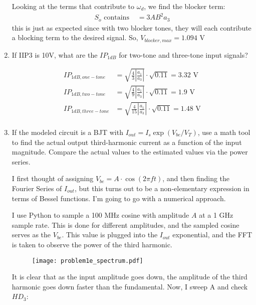 \begin{enumerate}[label=(\alph*)]
    Looking at the terms that contribute to $\omega_d$, we find the blocker term:
    \begin{align*}
        S_o \text{ contains } &= 3 A B^2 a_3
    \end{align*}
    this is just as expected since with two blocker tones, they will each contribute a blocking term to the desired signal.
    So, $V_{blocker,max} = 1.094 \text{ V}$

    \item {\color{blue} If IIP3 is 10V, what are the $IP_{1dB}$ for two-tone and three-tone input signals?}

    \begin{align*}
        IP_{1dB,one-tone} &= \sqrt{\frac{4}{3} |\frac{a_1}{a_3}|} \cdot \sqrt{0.11} = 3.32 \text{ V} \\
        IP_{1dB,two-tone} &= \sqrt{\frac{4}{9} |\frac{a_1}{a_3}|} \cdot \sqrt{0.11} = 1.9 \text{ V}\\
        IP_{1dB,three-tone} &= \sqrt{\frac{4}{15} |\frac{a_1}{a_3}|} \cdot \sqrt{0.11} = 1.48 \text{ V} \\
    \end{align*}

    \item {\color{blue} If the modeled circuit is a BJT with $I_{out} = I_s \exp(V_{be}/V_{T})$, use a math tool to find the actual output third-harmonic current as a function of the input magnitude. Compare the actual values to the estimated values via the power series.}

    I first thought of assigning $V_{be} = A \cdot \cos(2 \pi f t)$, and then finding the Fourier Series of $I_{out}$, but this turns out to be a non-elementary expression in terms of Bessel functions. I'm going to go with a numerical approach.

    I use Python to sample a 100 MHz cosine with amplitude $A$ at a 1 GHz sample rate. This is done for different amplitudes, and the sampled cosine serves as the $V_{be}$. This value is plugged into the $I_{out}$ exponential, and the FFT is taken to observe the power of the third harmonic.

    \begin{figure}[H]
        \centering \texttt{[image: problem1e\_spectrum.pdf]}
    \end{figure}

    It is clear that as the input amplitude goes down, the amplitude of the third harmonic goes down faster than the fundamental.
    Now, I sweep A and check $HD_3$:


\end{enumerate}
